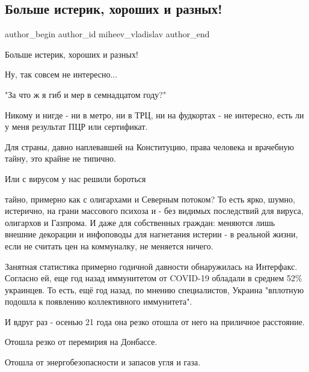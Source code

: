  
 
 
 
 
 
\subsection{Больше истерик, хороших и разных!}
\label{sec:02_11_2021.fb.miheev_vladislav.1.isteriki}
 
\ifcmt
 author_begin
   author_id miheev_vladislav
 author_end
\fi

Больше истерик, хороших и разных!

Ну, так совсем не интересно... 

"За что ж я гиб и мер в семнадцатом году?"

Никому и нигде - ни в метро, ни в ТРЦ, ни на фудкортах - не интересно, есть ли
у меня результат ПЦР или сертификат.

Для страны, давно наплевавшей на Конституцию,  права человека и врачебную
тайну, это крайне не типично.

Или с вирусом у нас решили бороться 

тайно, примерно как с олигархами и Северным потоком? То есть ярко, шумно,
истерично, на грани массового психоза и - без видимых последствий для вируса,
олигархов и Газпрома. И даже для собственных граждан:  меняются лишь внешние
декорации и инфоповоды для нагнетания истерии - в реальной жизни, если не
считать цен на коммуналку, не меняется ничего.

Занятная статистика примерно годичной давности обнаружилась на Интерфакс.
Согласно ей, еще год назад  иммунитетом от COVID-19 обладали в среднем 52\%
украинцев. То есть, ещё год назад, по мнению специалистов, Украина "вплотную
подошла к появлению коллективного иммунитета".

И вдруг раз - осенью 21 года она резко отошла от него на приличное расстояние.

Отошла резко от перемирия на Донбассе.

Отошла от энергобезопасности и запасов угля и газа.

